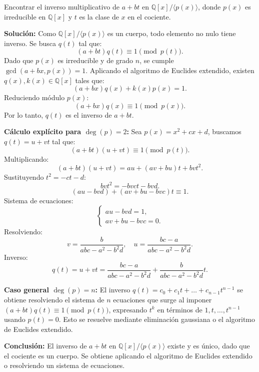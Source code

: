 Encontrar el inverso multiplicativo de \( a + b t \) en \( \mathbb{Q}[x] / \langle p(x) \rangle \), donde \( p(x) \) es irreducible en \( \mathbb{Q}[x] \) y \( t \) es la clase de \( x \) en el cociente.

\textbf{Solución:} Como \( \mathbb{Q}[x] / \langle p(x) \rangle \) es un cuerpo, todo elemento no nulo tiene inverso. Se busca \( q(t) \) tal que:
\[
(a + b t) q(t) \equiv 1 \pmod{p(t)}.
\]
Dado que \( p(x) \) es irreducible y de grado \( n \), se cumple \( \gcd(a + b x, p(x)) = 1 \). Aplicando el algoritmo de Euclides extendido, existen \( q(x), k(x) \in \mathbb{Q}[x] \) tales que:
\[
(a + b x) q(x) + k(x) p(x) = 1.
\]
Reduciendo módulo \( p(x) \):
\[
(a + b x) q(x) \equiv 1 \pmod{p(x)}.
\]
Por lo tanto, \( q(t) \) es el inverso de \( a + b t \).

\textbf{Cálculo explícito para \( \deg(p) = 2 \):}  
Sea \( p(x) = x^2 + c x + d \), buscamos \( q(t) = u + v t \) tal que:
\[
(a + b t)(u + v t) \equiv 1 \pmod{p(t)}.
\]
Multiplicando:
\[
(a + b t)(u + v t) = a u + (a v + b u) t + b v t^2.
\]
Sustituyendo \( t^2 = -c t - d \):
\[
b v t^2 = -b v c t - b v d.
\]
\[
(a u - b v d) + (a v + b u - b v c) t \equiv 1.
\]
Sistema de ecuaciones:
\[
\begin{cases}
a u - b v d = 1, \\
a v + b u - b v c = 0.
\end{cases}
\]
Resolviendo:
\[
v = \frac{b}{a b c - a^2 - b^2 d}, \quad u = \frac{b c - a}{a b c - a^2 - b^2 d}.
\]
Inverso:
\[
q(t) = u + v t = \frac{b c - a}{a b c - a^2 - b^2 d} + \frac{b}{a b c - a^2 - b^2 d} t.
\]

\textbf{Caso general \( \deg(p) = n \):}  
El inverso \( q(t) = c_0 + c_1 t + \dots + c_{n-1} t^{n-1} \) se obtiene resolviendo el sistema de \( n \) ecuaciones que surge al imponer \( (a + b t) q(t) \equiv 1 \pmod{p(t)} \), expresando \( t^k \) en términos de \( 1, t, \dots, t^{n-1} \) usando \( p(t) = 0 \). Esto se resuelve mediante eliminación gaussiana o el algoritmo de Euclides extendido.

\textbf{Conclusión:}  
El inverso de \( a + b t \) en \( \mathbb{Q}[x]/\langle p(x) \rangle \) existe y es único, dado que el cociente es un cuerpo. Se obtiene aplicando el algoritmo de Euclides extendido o resolviendo un sistema de ecuaciones.

